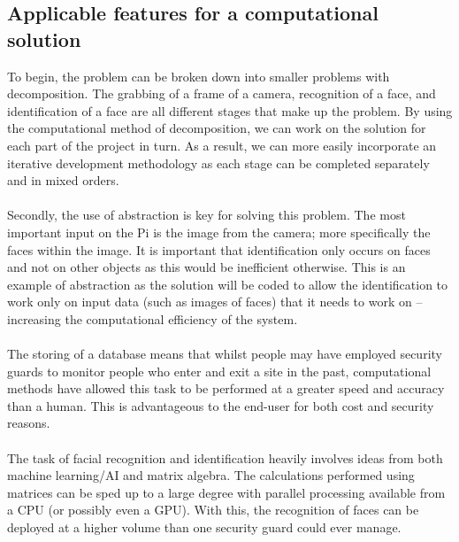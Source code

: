 \documentclass[9pt]{article}
\begin{document}
\subsection{Applicable features for a computational solution}\label{sec_essential}
To begin, the problem can be broken down into smaller problems with decomposition. The grabbing of a frame of a camera, recognition of a face, and identification of a face are all different stages that make up the problem. By using the computational method of decomposition, we can work on the solution for each part of the project in turn. As a result, we can more easily incorporate an iterative development methodology as each stage can be completed separately and in mixed orders.\\\\
Secondly, the use of abstraction is key for solving this problem. The most important input on the Pi is the image from the camera; more specifically the faces within the image. It is important that identification only occurs on faces and not on other objects as this would be inefficient otherwise. This is an example of abstraction as the solution will be coded to allow the identification to work only on input data (such as images of faces) that it needs to work on -- increasing the computational efficiency of the system.\\\\
The storing of a database means that whilst people may have employed security guards to monitor people who enter and exit a site in the past, computational methods have allowed this task to be performed at a greater speed and accuracy than a human. This is advantageous to the end-user for both cost and security reasons.\\\\
The task of facial recognition and identification heavily involves ideas from both machine learning/AI and matrix algebra. The calculations performed using matrices can be sped up to a large degree with parallel processing available from a CPU (or possibly even a GPU). With this, the recognition of faces can be deployed at a higher volume than one security guard could ever manage.
\end{document}
